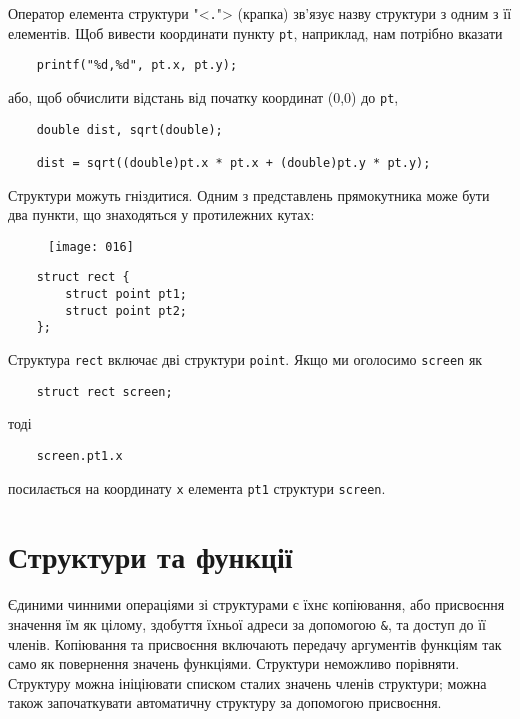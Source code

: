 \documentclass[a4paper,12pt]{book}
\begin{document}
  Оператор елемента структури "<\texttt{.}"> (крапка) зв'язує назву структури з
  одним з її елементів. Щоб вивести координати пункту \texttt{pt}, наприклад, нам потрібно
  вказати
  \begin{verbatim}
    printf("%d,%d", pt.x, pt.y);
  \end{verbatim}
  або, щоб обчислити відстань від початку координат (0,0) до
  \texttt{pt},
  \begin{verbatim}
    double dist, sqrt(double);

    dist = sqrt((double)pt.x * pt.x + (double)pt.y * pt.y);
  \end{verbatim}

  Структури можуть гніздитися. Одним з представлень прямокутника може бути два пункти,
  що знаходяться у протилежних кутах:
%
  \begin{figure}[!htb]
  \centering
  \texttt{[image: 016]}
  \end{figure}
  \begin{verbatim}
    struct rect {
        struct point pt1;
        struct point pt2;
    };
  \end{verbatim}

  Структура \texttt{rect} включає дві структури \texttt{point}. Якщо ми оголосимо
  \texttt{screen} як
  \begin{verbatim}
    struct rect screen;
  \end{verbatim}
  тоді
  \begin{verbatim}
    screen.pt1.x
  \end{verbatim}
  посилається на координату \texttt{x} елемента \texttt{pt1} структури \texttt{screen}.

\section{Структури та функції}


  Єдиними чинними операціями зі структурами є їхнє копіювання, або присвоєння
  значення їм як цілому, здобуття їхньої адреси за допомогою \texttt{\&}, та доступ до
  її членів. Копіювання та присвоєння включають передачу аргументів функціям так само як
  повернення значень функціями. Структури неможливо порівняти. Структуру можна ініціювати
  списком сталих значень членів структури; можна також започаткувати автоматичну структуру
  за допомогою присвоєння.
\end{document}
